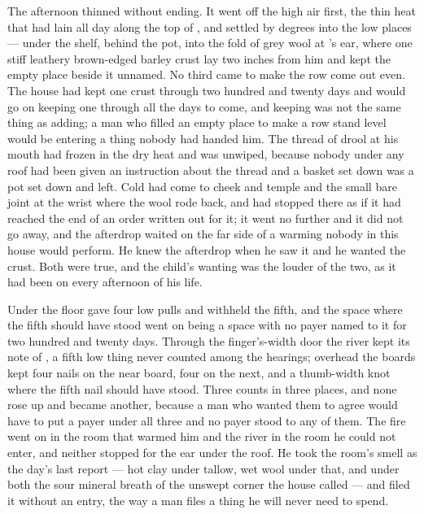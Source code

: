 The afternoon thinned without ending. It went off the high air first, the thin heat that had lain all day along the top of , and settled by degrees into the low places --- under the shelf, behind the pot, into the fold of grey wool at 's ear, where one stiff leathery brown-edged barley crust lay two inches from him and kept the empty place beside it unnamed. No third came to make the row come out even. The house had kept one crust through two hundred and twenty days and would go on keeping one through all the days to come, and keeping was not the same thing as adding; a man who filled an empty place to make a row stand level would be entering a thing nobody had handed him. The thread of drool at his mouth had frozen in the dry heat and was unwiped, because nobody under any roof had been given an instruction about the thread and a basket set down was a pot set down and left. Cold had come to cheek and temple and the small bare joint at the wrist where the wool rode back, and had stopped there as if it had reached the end of an order written out for it; it went no further and it did not go away, and the afterdrop waited on the far side of a warming nobody in this house would perform. He knew the afterdrop when he saw it and he wanted the crust. Both were true, and the child's wanting was the louder of the two, as it had been on every afternoon of his life.

Under the floor  gave four low pulls and withheld the fifth, and the space where the fifth should have stood went on being a space with no payer named to it for two hundred and twenty days. Through the finger's-width door the river kept its note of , a fifth low thing never counted among the hearings; overhead the boards kept four nails on the near board, four on the next, and a thumb-width knot where the fifth nail should have stood. Three counts in three places, and none rose up and became another, because a man who wanted them to agree would have to put a payer under all three and no payer stood to any of them. The fire went on in the room that warmed him and the river in the room he could not enter, and neither stopped for the ear under the roof. He took the room's smell as the day's last report --- hot clay under tallow, wet wool under that, and under both the sour mineral breath of the unswept corner the house called  --- and filed it without an entry, the way a man files a thing he will never need to spend.

\scenebreak

